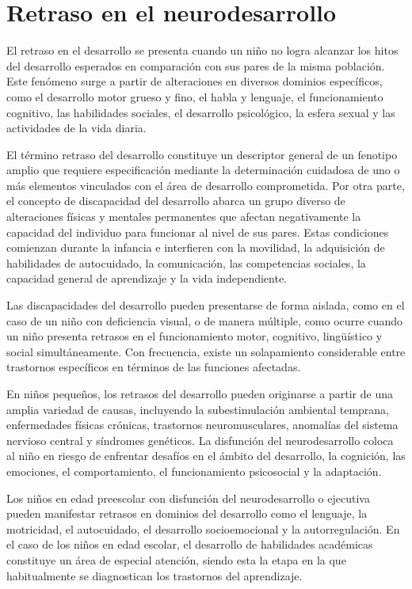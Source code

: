 \section{Retraso en el neurodesarrollo}
El retraso en el desarrollo se presenta cuando un niño no logra alcanzar los 
hitos del desarrollo esperados en comparación con sus pares de la misma 
población. Este fenómeno surge a partir de alteraciones en diversos dominios 
específicos, como el desarrollo motor grueso y fino, el habla y lenguaje, el 
funcionamiento cognitivo, las habilidades sociales, el desarrollo psicológico, 
la esfera sexual y las actividades de la vida diaria. \cite{DevelopmentalDelay}

El término retraso del desarrollo constituye un descriptor general de un
fenotipo amplio que requiere especificación mediante la determinación cuidadosa
de uno o más elementos vinculados con el área de desarrollo comprometida.
\cite{DevelopmentalDelay} Por otra parte, el concepto de discapacidad del
desarrollo abarca un grupo diverso de alteraciones físicas y mentales
permanentes que afectan negativamente la capacidad del individuo para funcionar
al nivel de sus pares. Estas condiciones comienzan durante la infancia e
interfieren con la movilidad, la adquisición de habilidades de autocuidado, la
comunicación, las competencias sociales, la capacidad general de aprendizaje y
la vida independiente. \cite{Simms2023}

Las discapacidades del desarrollo pueden presentarse de forma aislada, como en 
el caso de un niño con deficiencia visual, o de manera múltiple, como ocurre 
cuando un niño presenta retrasos en el funcionamiento motor, cognitivo, 
lingüístico y social simultáneamente. Con frecuencia, existe un solapamiento 
considerable entre trastornos específicos en términos de las funciones 
afectadas. \cite{Simms2023}

En niños pequeños, los retrasos del desarrollo pueden originarse a partir de 
una amplia variedad de causas, incluyendo la subestimulación ambiental 
temprana, enfermedades físicas crónicas, trastornos neuromusculares, anomalías 
del sistema nervioso central y síndromes genéticos. \cite{Simms2023} La 
disfunción del neurodesarrollo coloca al niño en riesgo de enfrentar desafíos 
en el ámbito del desarrollo, la cognición, las emociones, el comportamiento, 
el funcionamiento psicosocial y la adaptación.

Los niños en edad preescolar con disfunción del neurodesarrollo o ejecutiva 
pueden manifestar retrasos en dominios del desarrollo como el lenguaje, la 
motricidad, el autocuidado, el desarrollo socioemocional y la autorregulación. 
En el caso de los niños en edad escolar, el desarrollo de habilidades
académicas constituye un área de especial atención, siendo esta la etapa en la
que  habitualmente se diagnostican los trastornos del aprendizaje.
\cite{Nelson49}

